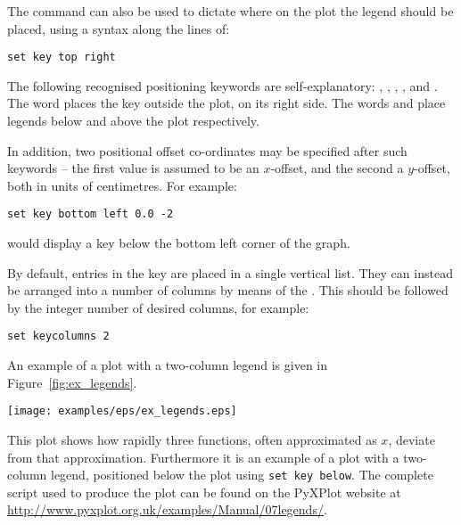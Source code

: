 The  command can also be used to dictate where on the plot the
legend should be placed, using a syntax along the lines of:

\begin{verbatim}
set key top right
\end{verbatim}

The following recognised positioning keywords are self-explanatory:
, , , ,
 and . The word  places the
key outside the plot, on its right side. The words  and
 place legends below and above the plot respectively.

In addition, two positional offset co-ordinates may be specified after such
keywords -- the first value is assumed to be an $x$-offset, and the second a
$y$-offset, both in units of centimetres. For example:

\begin{verbatim}
set key bottom left 0.0 -2
\end{verbatim}

\noindent would display a key below the bottom left corner of the graph.

By default, entries in the key are placed in a single vertical list. They can
instead be arranged into a number of columns by means of the . This should be followed by the integer number of desired columns,
for example:

\begin{verbatim}
set keycolumns 2
\end{verbatim}

\noindent An example of a plot with a two-column legend is given in
Figure~\ref{fig:ex_legends}.

\begin{example}
\begin{center}
\texttt{[image: examples/eps/ex\_legends.eps]}
\end{center}
\caption[A plot demonstrating the use of a two-column legend]
{This plot shows how rapidly three functions, often approximated as
$x$, deviate from that approximation.  Furthermore it is an example of a plot
with a two-column legend, positioned below the plot using {\tt set key below}.
The complete script used to produce the plot can be found on the PyXPlot
website at \protect\url{http://www.pyxplot.org.uk/examples/Manual/07legends/}.}
\label{fig:ex_legends}
\end{example}

